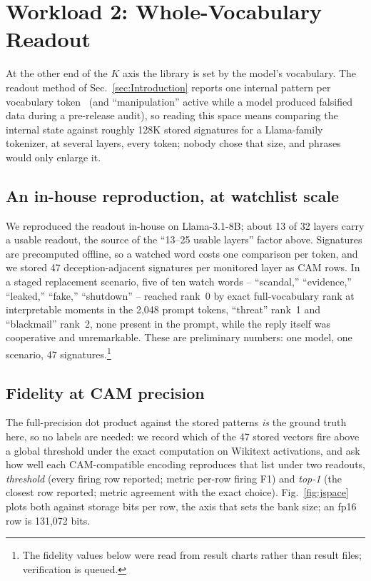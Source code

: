 \documentclass[conference]{IEEEtran}
\newcommand{\cam}{{CAM}\xspace}
\begin{document}
\section{Workload 2: Whole-Vocabulary Readout}
\label{sec:LargeK}
\label{subsec:Jspace}
At the other end of the $K$ axis the library is set by the model's
vocabulary. The readout method of Sec.~\ref{sec:Introduction}
reports one internal pattern per vocabulary
token~\cite{anthropic2026workspace} (and ``manipulation'' active
while a model produced falsified data during a pre-release audit), so
reading this space means comparing the internal state against
roughly 128K stored signatures for a Llama-family tokenizer, at
several layers, every token; nobody chose that size, and phrases
would only enlarge it.

\subsection{An in-house reproduction, at watchlist scale}
\label{subsec:Watchlist}
We reproduced the readout in-house on Llama-3.1-8B; about 13 of 32
layers carry a usable readout, the source of the ``13--25 usable
layers'' factor above. Signatures are
precomputed offline, so a watched word costs one comparison per
token, and we stored 47 deception-adjacent signatures per monitored
layer as \cam rows. In a staged replacement scenario, five of ten
watch words -- ``scandal,'' ``evidence,''
``leaked,'' ``fake,'' ``shutdown'' -- reached rank~0 by exact
full-vocabulary rank at interpretable moments in the 2{,}048 prompt
tokens, ``threat'' rank~1 and ``blackmail'' rank~2, none present in
the prompt, while the reply itself was cooperative and unremarkable. These are preliminary numbers: one
model, one scenario, 47 signatures.\footnote{The fidelity values below were read from result
charts rather than result files; verification is queued.}

\subsection{Fidelity at \cam precision}
\label{subsec:JspaceFidelity}
The full-precision dot product against the stored patterns \emph{is}
the ground truth here, so no labels are needed: we record which of
the 47 stored vectors fire above a global threshold under the exact
computation on Wikitext activations, and ask how well each
\cam-compatible encoding reproduces that list under two readouts,
\emph{threshold} (every firing row reported; metric per-row firing
F1) and \emph{top-1} (the closest row reported; metric agreement with
the exact choice). Fig.~\ref{fig:jspace} plots both against storage
bits per row, the axis that sets the bank size; an fp16 row is
131{,}072 bits.
\end{document}
